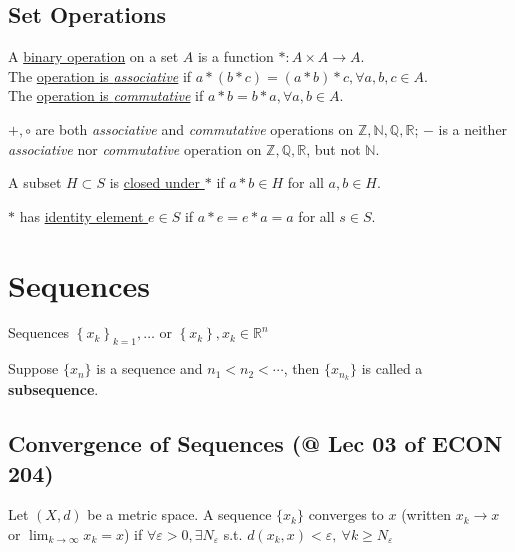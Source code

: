 \documentclass[11pt]{elegantbook}
\begin{document}
\subsection{Set Operations}
\begin{definition}
    \normalfont
    A \underline{binary operation} on a set $A$ is a function $*:A\times A \rightarrow A$.\\
    The \underline{operation is \textit{associative}} if $a*(b*c)=(a*b)*c, \forall a,b,c\in A$.\\
    The \underline{operation is \textit{commutative}} if $a*b=b*a, \forall a,b\in A$.
\end{definition}

\begin{example}

${+,\circ}$ are both \textit{associative} and \textit{commutative} operations on $\mathbb{Z},\mathbb{N},\mathbb{Q},\mathbb{R}$; $-$ is a neither \textit{associative} nor \textit{commutative} operation on $\mathbb{Z},\mathbb{Q},\mathbb{R}$, but not $\mathbb{N}$.
\end{example}

\begin{definition}
A subset $H\subset S$ is \underline{closed under $*$} if $a*b\in H$ for all $a,b\in H$.
\end{definition}

\begin{definition}
$*$ has \underline{identity element $e\in S$} if $a*e=e*a=a$ for all $s\in S$.
\end{definition}



\section{Sequences}
Sequences $\left\{x_{k}\right\}_{k=1}, \ldots$ or $\left\{x_{k}\right\}, x_{k} \in \mathbb{R}^{n}$

\begin{definition}[Subsequence]
\normalfont
    Suppose $\{x_n\}$ is a sequence and $n_1<n_2<\cdots$, then $\{x_{n_k}\}$ is called a \textbf{subsequence}.
\end{definition}

\subsection{Convergence of Sequences \small{(@ Lec 03 of ECON 204)}}
\begin{definition}[Convergence: note $x_{k} \rightarrow x, \lim _{k \rightarrow \infty} x_{k}=x$]
    Let $(X, d)$ be a metric space. A sequence $\{x_k\}$ converges to $x$ (written $x_{k} \rightarrow x$ or $\lim _{k \rightarrow \infty} x_{k}=x$) if $\forall \varepsilon>0, \exists N_{\varepsilon}$ s.t. $d(x_{k},x)<\varepsilon,\ \forall k \geqslant N_{\varepsilon}$
\end{definition}
\end{document}
